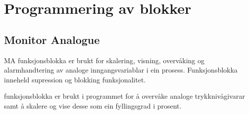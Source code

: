 \section{Programmering av blokker}
\thispagestyle{fancy}



\subsection{Monitor Analogue}
\gls{MA} funksjonsblokka er brukt for skalering, visning, overvåking og alarmhandtering av analoge inngangsvariablar i ein prosess.
Funksjonsblokka inneheld supression og blokking funksjonalitet.

funksjonsblokka er brukt i programmet for å overvåke analoge trykknivågivarar samt å skalere og vise desse som ein fyllingsgrad i prosent.

